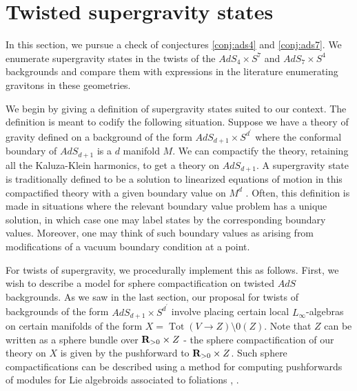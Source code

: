 \documentclass[../main.tex]{subfiles}
\begin{document}
\section{Twisted supergravity states}
\label{sec:states}


In this section, we pursue a check of conjectures \ref{conj:ads4} and \ref{conj:ads7}. We enumerate supergravity states in the twists of the $AdS_4\times S^7$ and $AdS_7\times S^4$ backgrounds and compare them with expressions in the literature enumerating gravitons in these geometries. 

We begin by giving a definition of supergravity states suited to our context. The definition is meant to codify the following situation. Suppose we have a theory of gravity defined on a background of the form $AdS_{d+1} \times S^{d^\prime}$ where the conformal boundary of $AdS_{d+1}$ is a $d$ manifold $M$. We can compactify the theory, retaining all the Kaluza-Klein harmonics, to get a theory on $AdS_{d+1}$. A supergravity state is traditionally defined to be a solution to linearized equations of motion in this compactified theory with a given boundary value on $M^{d}$ \cite{WittenAdS}. Often, this definition is made in situations where the relevant boundary value problem has a unique solution, in which case one may label states by the corresponding boundary values. Moreover, one may think of such boundary values as arising from modifications of a vacuum boundary condition at a point.

\parsec[]

For twists of supergravity, we procedurally implement this as follows. First, we wish to describe a model for sphere compactification on twisted $AdS$ backgrounds. As we saw in the last section, our proposal for twists of backgrounds of the form $AdS_{d+1}\times S^{d^\prime}$ involve placing certain local $L_\infty$-algebras on certain manifolds of the form $X = \operatorname{Tot }(V\to Z)\setminus 0(Z)$. Note that $Z$ can be written as a sphere bundle over $\mathbf{R}_{>0}\times Z$ - the sphere compactification of our theory on $X$ is given by the pushforward to $\mathbf{R}_{>0}\times Z$. Such sphere compactifications can be described using a method for computing pushforwards of modules for Lie algebroids associated to foliations \cite[Sec. 4.2]{KormanThesis}, \cite{KamberTondeur}.
\end{document}
